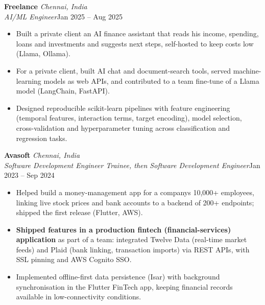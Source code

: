 \documentclass[a4paper,11pt]{article}
\newcommand{\role}[4]{%
  \textbf{#1}{\color{muted}\,\textperiodcentered\,\textit{#2}}\\
  \textit{#4}\hfill{\color{muted}#3}\par}
\newcommand{\gap}{\vspace{5pt}}
\newcommand{\num}[1]{\textbf{#1}}   %
\begin{document}
\role{Freelance}{Chennai, India}{Jan 2025 – Aug 2025}{AI/ML Engineer}
\begin{itemize}
  \item Built a private client an AI finance assistant that reads his income, spending, loans and investments and suggests next steps, self-hosted to keep costs low (Llama, Ollama).
  \item For a private client, built AI chat and document-search tools, served machine-learning models as web APIs, and contributed to a team fine-tune of a Llama model (LangChain, FastAPI).
  \item Designed reproducible scikit-learn pipelines with feature engineering (temporal features, interaction terms, target encoding), model selection, cross-validation and hyperparameter tuning across classification and regression tasks.
\end{itemize}
\gap
{}
\role{Avasoft}{Chennai, India}{Jan 2023 – Sep 2024}{Software Development Engineer Trainee, then Software Development Engineer}
\begin{itemize}
  \item Helped build a money-management app for a company\textquotesingle{}s 10,000+ employees, linking live stock prices and bank accounts to a backend of 200+ endpoints; shipped the first release (Flutter, AWS).
  \item \num{Shipped features in a production fintech (financial-services) application} as part of a team: integrated Twelve Data (real-time market feeds) and Plaid (bank linking, transaction imports) via REST APIs, with SSL pinning and AWS Cognito SSO.
  \item Implemented offline-first data persistence (Isar) with background synchronisation in the Flutter FinTech app, keeping financial records available in low-connectivity conditions.
\end{itemize}
\end{document}
